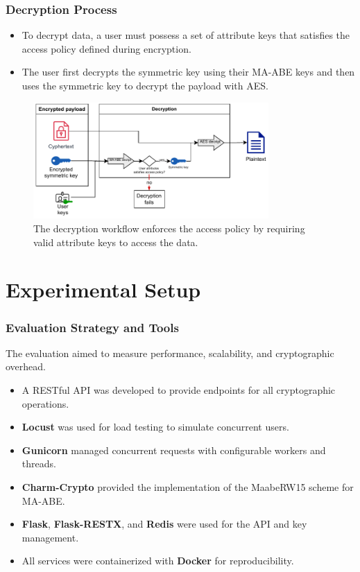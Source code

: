 \documentclass{beamer}
\begin{document}
\begin{frame}
    \frametitle{Decryption Process}
    \begin{itemize}
        \item To decrypt data, a user must possess a set of attribute keys that satisfies the access policy defined during encryption.
        \item The user first decrypts the symmetric key using their MA-ABE keys and then uses the symmetric key to decrypt the payload with AES.
    \end{itemize}
    \begin{figure}
        \includegraphics[width=0.8\textwidth]{images/diagrams/decryption_diagram.pdf}
        \caption{The decryption workflow enforces the access policy by requiring valid attribute keys to access the data.}
    \end{figure}
\end{frame}


\section{Experimental Setup}

\begin{frame}
    \frametitle{Evaluation Strategy and Tools}
    The evaluation aimed to measure performance, scalability, and cryptographic overhead.
    \begin{itemize}
        \item A RESTful API was developed to provide endpoints for all cryptographic operations.
        \item \textbf{Locust} was used for load testing to simulate concurrent users.
        \item \textbf{Gunicorn} managed concurrent requests with configurable workers and threads.
        \item \textbf{Charm-Crypto} provided the implementation of the MaabeRW15 scheme for MA-ABE.
        \item \textbf{Flask}, \textbf{Flask-RESTX}, and \textbf{Redis} were used for the API and key management.
        \item All services were containerized with \textbf{Docker} for reproducibility.
    \end{itemize}
\end{frame}
\end{document}
